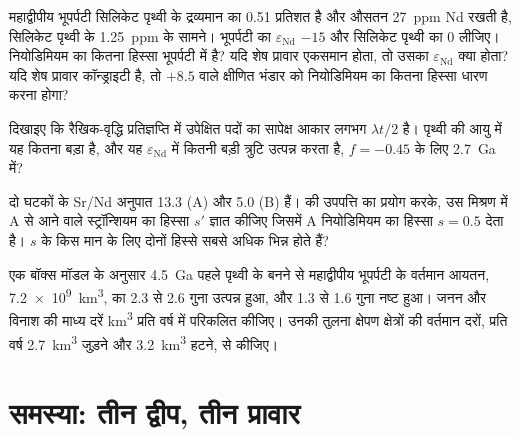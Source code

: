 \begin{exercise}[$\star\star$]\label{exo:b2:isotope-geochemistry:9}
महाद्वीपीय भूपर्पटी सिलिकेट पृथ्वी के द्रव्यमान का 0.51 प्रतिशत है और
औसतन \qty{27}{ppm} Nd रखती है, सिलिकेट पृथ्वी के \qty{1.25}{ppm} के सामने।
भूपर्पटी का $\varepsilon_{\mathrm{Nd}}$ $-15$ और सिलिकेट पृथ्वी का 0 लीजिए। नियोडिमियम का
कितना हिस्सा भूपर्पटी में है? यदि शेष प्रावार एकसमान होता, तो
उसका $\varepsilon_{\mathrm{Nd}}$ क्या होता? यदि शेष प्रावार कॉन्ड्राइटी है, तो $+8.5$ वाले
क्षीणित भंडार को नियोडिमियम का कितना हिस्सा धारण करना होगा?
\end{exercise}

\begin{exercise}[$\star\star\star$]\label{exo:b2:isotope-geochemistry:10}
दिखाइए कि रैखिक-वृद्धि प्रतिज्ञप्ति में उपेक्षित पदों का सापेक्ष
आकार लगभग $\lambda t/2$ है। पृथ्वी की आयु में यह कितना बड़ा है, और
यह $\varepsilon_{\mathrm{Nd}}$ में कितनी बड़ी त्रुटि उत्पन्न करता है,
$f = -0.45$ के लिए \qty{2.7}{Ga} में?
\end{exercise}

\begin{exercise}[$\star\star\star$]\label{exo:b2:isotope-geochemistry:11}
दो घटकों के Sr/Nd अनुपात 13.3 (A) और 5.0 (B) हैं।  की
उपपत्ति का प्रयोग करके, उस मिश्रण में A से आने वाले स्ट्रॉन्शियम का हिस्सा $s'$ ज्ञात कीजिए जिसमें A
नियोडिमियम का हिस्सा $s = 0.5$ देता है। $s$ के किस मान के लिए दोनों
हिस्से सबसे अधिक भिन्न होते हैं?
\end{exercise}

\begin{exercise}[$\star\star\star$]\label{exo:b2:isotope-geochemistry:12}
एक बॉक्स मॉडल के अनुसार \qty{4.5}{Ga} पहले पृथ्वी के बनने से महाद्वीपीय भूपर्पटी के वर्तमान आयतन,
\qty{7.2e9}{km^3}, का 2.3 से 2.6 गुना उत्पन्न हुआ, और 1.3 से 1.6
गुना नष्ट हुआ। जनन और विनाश की माध्य दरें
\unit{km^3} प्रति वर्ष में परिकलित कीजिए। उनकी तुलना क्षेपण क्षेत्रों की वर्तमान दरों,
प्रति वर्ष \qty{2.7}{km^3} जुड़ने और \qty{3.2}{km^3} हटने, से कीजिए।
\end{exercise}

\section{समस्या: तीन द्वीप, तीन प्रावार}


